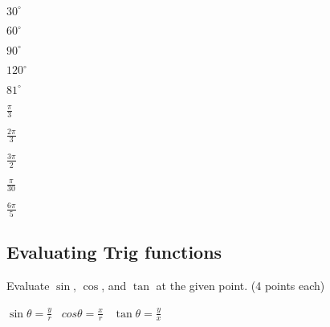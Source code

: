 \documentclass[12pt]{article}
\begin{document}
\begin{enumerate}[resume]
\begin{multicols}{2}

\item $30^\circ$\\

\item $60^\circ$\\

\item $90^\circ$\\

\item $120^\circ$\\

\item $81^\circ$\\

\columnbreak

\item $\frac{\pi}{3}$\\

\item $\frac{2\pi}{3}$\\

\item $\frac{3\pi}{2}$\\

\item $\frac{\pi}{30}$\\

\item $\frac{6\pi}{5}$\\

\end{multicols}
\end{enumerate}


\pagebreak

\subsection*{Evaluating Trig functions}

Evaluate $\sin$, $\cos$, and $\tan$ at the given point. (4 points each)\\

\begin{center}
$\sin\theta=\frac{y}{r}$ \ $cos\theta=\frac{x}{r}$ \ $\tan\theta=\frac{y}{x}$\\
\end{center}

\vspace{12pt}
\end{document}
